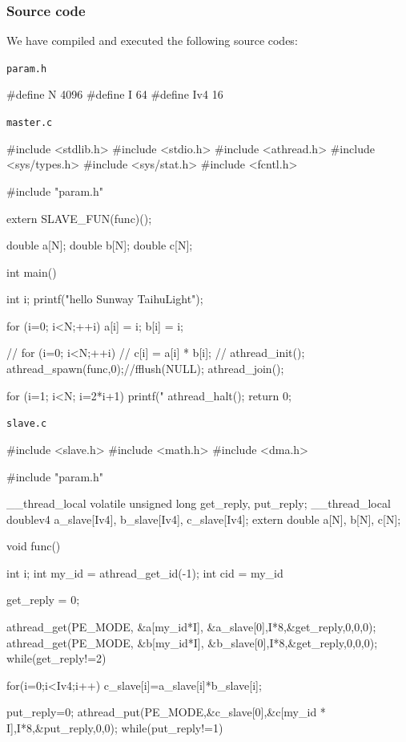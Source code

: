 \subsubsection{Source code}
 We have compiled and executed the following source codes:

\verb`param.h`
\begin{code}
#define N 4096
#define I 64
#define Iv4 16

\end{code}

\verb`master.c`
\begin{code}
#include <stdlib.h>
#include <stdio.h>
#include <athread.h>
#include <sys/types.h>
#include <sys/stat.h>
#include <fcntl.h>

#include "param.h"

extern SLAVE_FUN(func)();

double a[N];
double b[N];
double c[N];

int main() {
  int i;
  printf("hello Sunway TaihuLight\n");

  for (i=0; i<N;++i){
    a[i] = i;
    b[i] = i;
  }

  // for (i=0; i<N;++i){
  //   c[i] = a[i] * b[i];
  // }
  athread_init();
  athread_spawn(func,0);//fflush(NULL);
  athread_join();

  for (i=1; i<N; i=2*i+1){
    printf("%
  }
  athread_halt();
  return 0;
}

\end{code}

\verb`slave.c`
\begin{code}
#include <slave.h>
#include <math.h>
#include <dma.h>

#include "param.h"

__thread_local volatile unsigned long get_reply, put_reply;
__thread_local doublev4 a_slave[Iv4], b_slave[Iv4], c_slave[Iv4];
extern double a[N], b[N], c[N];

void func() {
  int i;
  int my_id = athread_get_id(-1);
  int cid = my_id%

  get_reply = 0;

  athread_get(PE_MODE, &a[my_id*I], &a_slave[0],I*8,&get_reply,0,0,0);
  athread_get(PE_MODE, &b[my_id*I], &b_slave[0],I*8,&get_reply,0,0,0);
  while(get_reply!=2) {}

  for(i=0;i<Iv4;i++){
    c_slave[i]=a_slave[i]*b_slave[i];
  }

  put_reply=0;
  athread_put(PE_MODE,&c_slave[0],&c[my_id * I],I*8,&put_reply,0,0);
  while(put_reply!=1) {}

}

\end{code}

